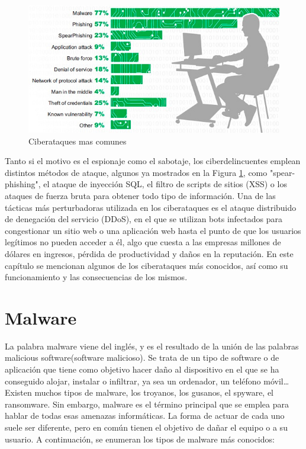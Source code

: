 \begin{figure}[tphb]
  		   \centering
     		   \includegraphics[width=5in]{ciberataques.png}
  		   \caption{Ciberataques mas comunes \cite{ciberataques}}
  		   \label{img:ciberataques}
\end{figure}

Tanto si el motivo es el espionaje como el sabotaje, los ciberdelincuentes emplean distintos métodos de ataque, algunos ya mostrados en la Figura \ref{img:ciberataques}, como "spear-phishing", el ataque de inyección SQL, el filtro de scripts de sitios (XSS) o los ataques de fuerza bruta para obtener todo tipo de información. Una de las tácticas más perturbadoras utilizada en los ciberataques 
es el ataque distribuido de denegación del servicio (DDoS), en el que se utilizan bots infectados para congestionar un sitio web o una aplicación web hasta el punto 
de que los usuarios legítimos no pueden acceder a él, algo que cuesta a las empresas millones de dólares en ingresos, pérdida de productividad y daños en la reputación.\nocite{akamai}
En este capítulo se mencionan algunos de los ciberataques más conocidos, así como su funcionamiento y las consecuencias de los mismos.

\section{Malware}
\label{sec:malware}

La palabra malware viene del inglés, y es el resultado de la unión de las palabras malicious software(software malicioso). Se trata de un tipo de software o de aplicación que tiene como objetivo hacer daño al dispositivo en el que se ha conseguido alojar, instalar o infiltrar, ya sea un ordenador, un teléfono móvil… 
Existen muchos tipos de malware, los troyanos, los gusanos, el spyware, el ransomware. Sin embargo, malware es el término principal que se emplea para hablar de todas esas amenazas informáticas. La forma de actuar de cada uno suele ser diferente, pero en común tienen el objetivo de dañar el equipo o a su usuario. A continuación, se enumeran los tipos de malware más conocidos:

